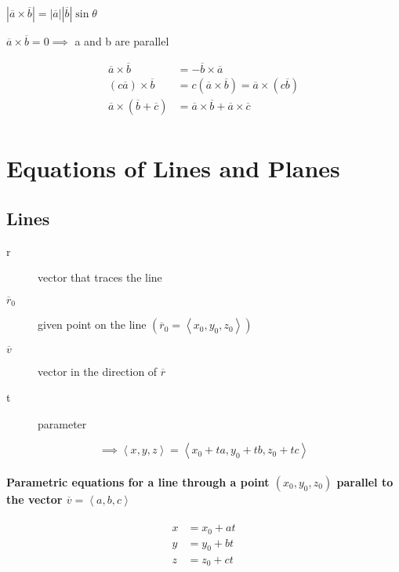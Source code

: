 
\begin{theorem}[]
	$\left| \overline{a} \times  \overline{b} \right|  = \left| \overline{a} \right| \left| \overline{b} \right| \sin \theta $
\end{theorem}

\begin{theorem}[parallel]
	$\overline{a} \times \overline{b} = 0 \implies$ a and b are parallel
\end{theorem}

\begin{align*}
	\overline{a} \times  \overline{b} &=  - \overline{b} \times  \overline{a} \\
	(c \overline{a}) \times \overline{b} &=  c(\overline{a} \times \overline{b}) = \overline{a} \times  (c \overline{b}) \\
	\overline{a} \times  ( \overline{b} + \overline{c}) &=  \overline{a} \times  \overline{b} + \overline{a} \times \overline{c}\\
\end{align*}


\section{Equations of Lines and Planes}%
\label{sec:equations_of_lines_and_planes}

\subsection{Lines}%
\label{sub:lines}


\begin{description}
	\item[r] vector that traces the line
	\item[$\overline{r}_0$] given point on the line $(\overline{r}_{0}= \left<x_0,y_0,z_0 \right>)$
		\item[$\overline{v}$] vector in the direction of $\overline{r}$
			\item[t] parameter
\end{description}


\[\implies \left<x,y,z \right> = \left<x_0 + ta, y_0 + tb, z_0 + tc \right>\]

\paragraph{Parametric equations for a line through a point $(x_0,y_0,z_0)$ parallel to the vector $\overline{v} = \left<a,b,c \right>$}


\begin{align*}
	x &=  x_0 + at \\
	y &=  y_0 +bt \\
	z &=  z_0 + ct \\
\end{align*}





\newpage



